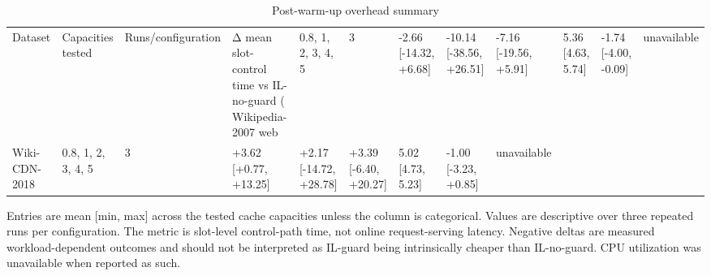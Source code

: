 \begin{table}[t]
\centering
\footnotesize
\caption{Post-warm-up overhead summary}
\label{tab:post_warmup_overhead_summary_paper}
\begin{tabular}{lllllllll}
\toprule
Dataset & Capacities tested & Runs/configuration & Δ mean slot-control time vs IL-no-guard (%
\midrule
Wikipedia-2007 web & 0.8, 1, 2, 3, 4, 5 & 3 & -2.66 [-14.32, +6.68] & -10.14 [-38.56, +26.51] & -7.16 [-19.56, +5.91] & 5.36 [4.63, 5.74] & -1.74 [-4.00, -0.09] & unavailable \\
Wiki-CDN-2018 & 0.8, 1, 2, 3, 4, 5 & 3 & +3.62 [+0.77, +13.25] & +2.17 [-14.72, +28.78] & +3.39 [-6.40, +20.27] & 5.02 [4.73, 5.23] & -1.00 [-3.23, +0.85] & unavailable \\
\bottomrule
\end{tabular}
\vspace{0.4ex}\par\scriptsize{Entries are mean [min, max] across the tested cache capacities unless the column is categorical. Values are descriptive over three repeated runs per configuration. The metric is slot-level control-path time, not online request-serving latency. Negative deltas are measured workload-dependent outcomes and should not be interpreted as IL-guard being intrinsically cheaper than IL-no-guard. CPU utilization was unavailable when reported as such.}
\end{table}
